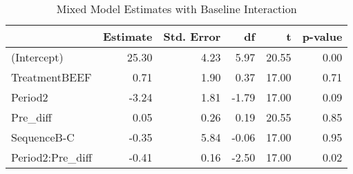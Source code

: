 \begin{table}[b]

\caption{\label{tab:proteinDataEstimates}Mixed Model Estimates with Baseline Interaction}
\centering
\begin{tabular}[t]{>{}l|rrrrr}
\toprule
 & Estimate & Std. Error & df & t & p-value\\
\midrule
(Intercept) & 25.30 & 4.23 & 5.97 & 20.55 & 0.00\\
TreatmentBEEF & 0.71 & 1.90 & 0.37 & 17.00 & 0.71\\
Period2 & -3.24 & 1.81 & -1.79 & 17.00 & 0.09\\
Pre\_diff & 0.05 & 0.26 & 0.19 & 20.55 & 0.85\\
SequenceB-C & -0.35 & 5.84 & -0.06 & 17.00 & 0.95\\
Period2:Pre\_diff & -0.41 & 0.16 & -2.50 & 17.00 & 0.02\\
\bottomrule
\end{tabular}
\end{table}
